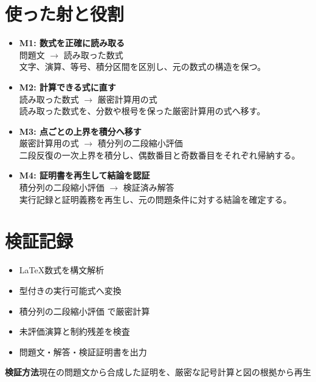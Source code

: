 \documentclass[uplatex,dvipdfmx,11pt]{jsarticle}
\begin{document}
\section*{使った射と役割}
\begin{itemize}
\item \textbf{M1: 数式を正確に読み取る}\\
問題文
$\longrightarrow$
読み取った数式\\
文字、演算、等号、積分区間を区別し、元の数式の構造を保つ。
\item \textbf{M2: 計算できる式に直す}\\
読み取った数式
$\longrightarrow$
厳密計算用の式\\
読み取った数式を、分数や根号を保った厳密計算用の式へ移す。
\item \textbf{M3: 点ごとの上界を積分へ移す}\\
厳密計算用の式
$\longrightarrow$
積分列の二段縮小評価\\
二段反復の一次上界を積分し、偶数番目と奇数番目をそれぞれ帰納する。
\item \textbf{M4: 証明書を再生して結論を認証}\\
積分列の二段縮小評価
$\longrightarrow$
検証済み解答\\
実行記録と証明義務を再生し、元の問題条件に対する結論を確定する。
\end{itemize}




\section*{検証記録}
\begin{itemize}
\item LaTeX数式を構文解析
\item 型付きの実行可能式へ変換
\item 積分列の二段縮小評価 で厳密計算
\item 未評価演算と制約残差を検査
\item 問題文・解答・検証証明書を出力
\end{itemize}
\noindent\textbf{検証方法}\quad 現在の問題文から合成した証明を、厳密な記号計算と図の根拠から再生
\par{}
\end{document}
